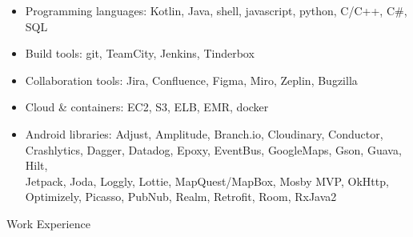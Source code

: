 \begin{itemize}
\item Programming languages: Kotlin, Java, shell, javascript, python, C/C++, C\#, SQL \\[-18pt]
\item Build tools: git, TeamCity, Jenkins, Tinderbox   \\[-18pt]
\item Collaboration tools: Jira, Confluence, Figma, Miro, Zeplin, Bugzilla    \\[-18pt]
\item Cloud \& containers: EC2, S3, ELB, EMR, docker  \\[-18pt]
\item Android libraries:
	Adjust, Amplitude, Branch.io, Cloudinary, Conductor,
	\\ Crashlytics, Dagger, Datadog, Epoxy, EventBus,
	GoogleMaps, Gson, Guava, Hilt, \\ Jetpack,
	Joda, Loggly, Lottie, MapQuest/MapBox, 
	Mosby MVP, OkHttp, \\ Optimizely, Picasso,
	PubNub, Realm, Retrofit, Room,
	RxJava2 \\
\end{itemize}


\begin{bf} \large
Work Experience
\end{bf}
\medskip

